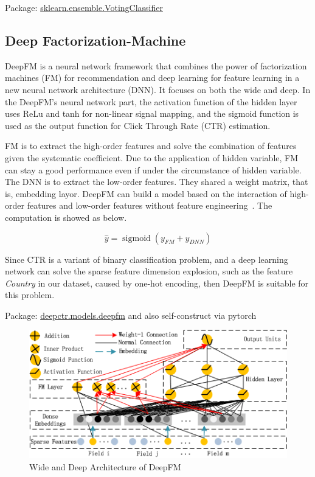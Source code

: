 \documentclass[10pt,twocolumn,letterpaper]{article}
\begin{document}
Package: \href{https://scikit-learn.org/stable/modules/generated/sklearn.ensemble.VotingClassifier.html}{sklearn.ensemble.VotingClassifier}


\subsection{Deep Factorization-Machine}
DeepFM is a neural network framework that combines the power of factorization machines (FM) for recommendation and deep learning for feature learning in a new neural network architecture (DNN). It focuses on both the wide and deep. In the DeepFM's neural network part, the activation function of the hidden layer uses ReLu and tanh for non-linear signal mapping, and the sigmoid function is used as the output function for Click Through Rate (CTR) estimation.

FM is to extract the high-order features and solve the combination of features given the systematic coefficient. Due to the application of hidden variable, FM can stay a good performance even if under the circumstance of hidden variable. The DNN is to extract the low-order features. They shared a weight matrix, that is, embedding layor. DeepFM can build a model based on the interaction of high-order features and low-order features without feature engineering~\cite{guo2017deepfm}. The computation is showed as below.

$$ \hat{y}=\operatorname{sigmoid}\left(y_{FM}+y_{DNN}\right) $$

Since CTR is a variant of binary classification problem, and a deep learning network can solve the sparse feature dimension explosion, such as the feature \emph{Country} in our dataset, caused by one-hot encoding, then DeepFM is suitable for this problem.

Package: \href{https://deepctr-doc.readthedocs.io/en/latest/deepctr.models.deepfm.html}{deepctr.models.deepfm} and also self-construct via pytorch

\begin{figure}[ht]
\begin{center}
    \includegraphics[width=0.8\linewidth]{images/DeepFM_Architecture.png}
\end{center}
   \caption{Wide and Deep Architecture of DeepFM}
\label{fig:DeepFM}
\end{figure}
\end{document}
